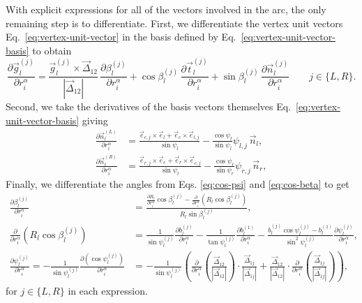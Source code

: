 \documentclass[11pt,twoside]{report}
\begin{document}
With explicit expressions for all of the vectors involved in the arc, the only remaining step is to differentiate.
First, we differentiate the vertex unit vectors Eq.\ \eqref{eq:vertex-unit-vector} in the basis defined by Eq.\ \eqref{eq:vertex-unit-vector-basis} to obtain
\begin{equation}
  \frac{\partial \vec{g}_l^{(j)}}{\partial r_i^\alpha} =
  \frac{\vec{g}_l^{(j)} \times \vec{\Delta}_{12}}{|\vec{\Delta}_{12}|} \,
  \frac{\partial \beta_l^{(j)}}{\partial r_i^\alpha} +
  \cos{\beta_l^{(j)}} \,
  \frac{\partial \vec{t}_l^{(j)}}{\partial r_i^\alpha} +
  \sin{\beta_l^{(j)}} \,
  \frac{\partial \vec{n}_l^{(j)}}{\partial r_i^\alpha}
  \qquad j \in \{L,R\}.
\end{equation}
Second, we take the derivatives of the basis vectors themselves Eq.\ \eqref{eq:vertex-unit-vector-basis} giving
\begin{subequations}
\begin{align}
  \frac{\partial \vec{n}_l^{(L)}}{\partial r_i^\alpha} &=
  \frac{\vec{e}_{c,j} \times \vec{e}_l + \vec{e}_c \times \vec{e}_{l,j}}{\sin{\psi_l}}
  - \frac{\cos{\psi_l}}{\sin{\psi_l}} \psi_{l,j} \, \vec{n}_l, \\
  \frac{\partial \vec{n}_l^{(R)}}{\partial r_i^\alpha} &=
  \frac{\vec{e}_{r,j} \times \vec{e}_c + \vec{e}_r \times \vec{e}_{c,j}}{\sin{\psi_r}}
  - \frac{\cos{\psi_r}}{\sin{\psi_r}} \psi_{r,j} \, \vec{n}_r,
\end{align}
\end{subequations}
Finally, we differentiate the angles from Eqs. \eqref{eq:cos-psi} and \eqref{eq:cos-beta} to get
\begin{subequations}
\begin{align}
 \frac{\partial \beta_l^{(j)}}{\partial r_i^\alpha} &=
  \frac{
  \frac{\partial R_l}{\partial r_i^\alpha}
  \cos{\beta_l^{(j)}} -
  \frac{\partial}{\partial r_i^\alpha}
  \left( R_l \cos{\beta_l^{(j)}} \right)}
  {R_l \sin{\beta_l^{(j)}}}, \\
 \frac{\partial}{\partial r_i^\alpha}
  \left( R_l \cos{\beta_l^{(j)}} \right) &=
  \frac{1}{\sin{\psi_l^{(j)}}}
  \frac{\partial b_l^{(j)}}{\partial r_i^\alpha}
  - \frac{1}{\tan{\psi_l^{(j)}}}
  \frac{\partial b_l^{(1)}}{\partial r_i^\alpha}
  - \frac{b_l^{(j)} \cos{\psi_l^{(j)}} - b_l^{(1)}}
  {\sin^2{\psi_l^{(j)}}}
  \frac{\partial \psi_l^{(j)}}{\partial r_i^\alpha}, \\
  \frac{\partial \psi_l^{(j)}}{\partial r_i^\alpha} =
  -\frac{1}{\sin\psi_l^{(j)}} \frac{\partial(\cos{\psi_l^{(j)}})}{\partial r_i^\alpha} &=
  -\frac{1}{\sin\psi_l^{(j)}}
  \left(
  \frac{\partial}{\partial r_i^\alpha}
  \left( \frac{\vec{\Delta}_{12}}{|\vec{\Delta}_{12}|} \right) \cdot
  \frac{\vec{\Delta}_{1j}}{|\vec{\Delta}_{1j}|}
  +
  \frac{\vec{\Delta}_{12}}{|\vec{\Delta}_{12}|} \cdot
  \frac{\partial}{\partial r_i^\alpha}
  \left( \frac{\vec{\Delta}_{1j}}{|\vec{\Delta}_{1j}|} \right)
  \right),
\end{align}
\end{subequations}
for $j \in \{L,R\}$ in each expression.
\end{document}
